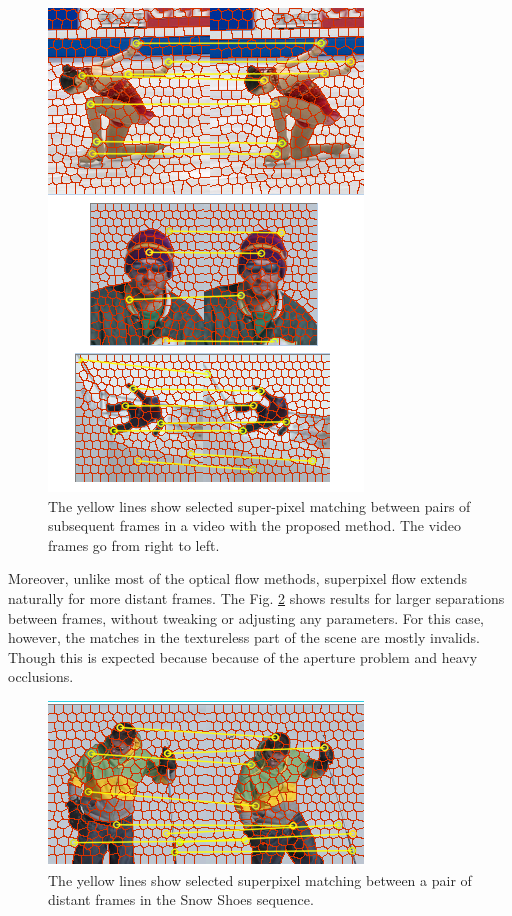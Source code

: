   \begin{figure}[thpb]
      \centering
      \includegraphics[height=0.33\textheight]{images/matches.png}
      \caption{The yellow lines show selected super-pixel
		matching between pairs of subsequent frames in a video
		with the proposed method. The video frames go from right
		to left.}
      \label{figurelabel_matches}
   \end{figure}
 
 Moreover, unlike most of the optical flow methods, superpixel flow extends 
 naturally for more distant frames. The Fig. \ref{figurelabel_matchessnow} shows
 results for larger separations between frames, without tweaking or adjusting any
 parameters. For this case, however, the matches in the textureless part of the scene
 are mostly invalids. Though this is expected because because of the aperture problem and
 heavy occlusions.
 
   \begin{figure}[thpb]
      \centering
      \includegraphics[height=0.1\textheight]{images/matches_snowshoes.png}
      \caption{The yellow lines show selected superpixel
		matching between a pair of distant frames in the Snow Shoes sequence.}
      \label{figurelabel_matchessnow}
   \end{figure}
   
